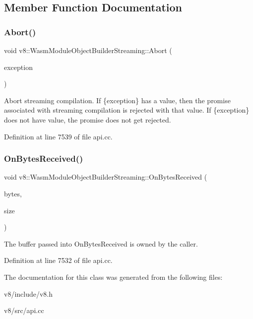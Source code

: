 \subsection{Member Function Documentation}
\mbox{\label{classv8_1_1WasmModuleObjectBuilderStreaming_ac8a2a6e122799d746ded69f80a295fb5}} 
\subsubsection{\texorpdfstring{Abort()}{Abort()}}
{\footnotesize\ttfamily void v8\+::\+Wasm\+Module\+Object\+Builder\+Streaming\+::\+Abort (\begin{DoxyParamCaption}\item[{\mbox{\hyperlink{classv8_1_1MaybeLocal}{Maybe\+Local}}$<$ \mbox{\hyperlink{classv8_1_1Value}{Value}} $>$}]{exception }\end{DoxyParamCaption})}

Abort streaming compilation. If \{exception\} has a value, then the promise associated with streaming compilation is rejected with that value. If \{exception\} does not have value, the promise does not get rejected. 

Definition at line 7539 of file api.\+cc.

\mbox{\label{classv8_1_1WasmModuleObjectBuilderStreaming_ac67b675b7241a18a3b773dab2f0fd458}} 
\subsubsection{\texorpdfstring{On\+Bytes\+Received()}{OnBytesReceived()}}
{\footnotesize\ttfamily void v8\+::\+Wasm\+Module\+Object\+Builder\+Streaming\+::\+On\+Bytes\+Received (\begin{DoxyParamCaption}\item[{const uint8\+\_\+t $\ast$}]{bytes,  }\item[{\mbox{\hyperlink{classsize__t}{size\+\_\+t}}}]{size }\end{DoxyParamCaption})}

The buffer passed into On\+Bytes\+Received is owned by the caller. 

Definition at line 7532 of file api.\+cc.



The documentation for this class was generated from the following files\+:\begin{DoxyCompactItemize}
\item 
v8/include/v8.\+h\item 
v8/src/api.\+cc\end{DoxyCompactItemize}
